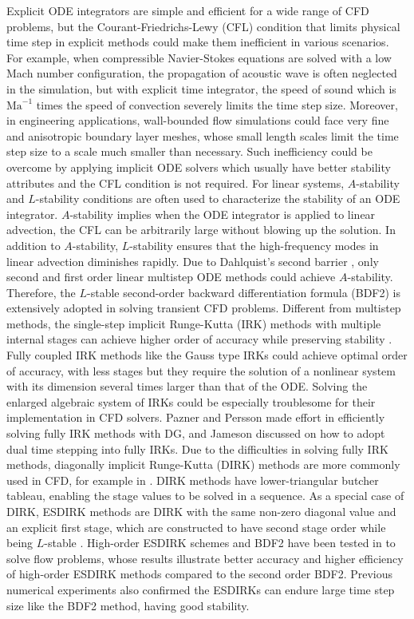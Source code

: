 Explicit ODE integrators
are simple and efficient for a wide range of
CFD problems, but the Courant-Friedrichs-Lewy (CFL) condition
that limits physical time step in explicit
methods could make them inefficient in various 
scenarios.
For example, 
when compressible Navier-Stokes equations are solved with a low Mach number configuration,
the propagation of acoustic wave is often neglected in the simulation, 
but with explicit time integrator, 
the speed of sound which is $\text{Ma}^{-1}$ times the 
speed of convection
severely limits the time step size.
Moreover, in engineering applications, 
wall-bounded flow simulations could face 
very fine and anisotropic boundary layer meshes,
whose small length scales limit the time step size 
to a scale much smaller than necessary.
Such inefficiency could be overcome by
applying implicit ODE solvers which
usually have better stability attributes and the CFL condition is not required.
For linear systems, $A$-stability and $L$-stability conditions \cite{wanner1996solving}
are often used to characterize the stability of an ODE integrator.
$A$-stability \cite{dahlquist1963special} implies 
when the ODE integrator is applied to linear advection, 
the CFL can be arbitrarily large without blowing up the solution.
In addition to $A$-stability, $L$-stability ensures that the high-frequency 
modes in linear advection diminishes rapidly.
Due to Dahlquist's second barrier
\cite{dahlquist1963special},
only second and first order linear multistep ODE methods
could achieve $A$-stability. 
Therefore,
the $L$-stable
second-order backward differentiation formula (BDF2)
is extensively adopted in solving transient CFD problems.
Different from multistep methods,
the single-step implicit Runge-Kutta (IRK) methods
with multiple internal stages
can achieve higher order of accuracy while
preserving stability \cite{butcher2016ODEBook}.
Fully coupled IRK methods like the Gauss type IRKs
could achieve optimal order of accuracy, 
with less stages
but they require the solution of a nonlinear
system with its dimension several times larger
than that of the ODE.
Solving the enlarged algebraic system of IRKs
could be especially troublesome for their implementation in
CFD solvers.
Pazner and Persson
\cite{pazner2017stage}
made effort in efficiently solving
fully IRK methods with DG, and
Jameson \cite{jameson2017evaluation}
discussed on how to adopt dual time stepping
into fully IRKs.
Due to the difficulties in solving
fully IRK methods,
diagonally implicit Runge-Kutta (DIRK)
methods are more commonly used in CFD, for example in
\cite{wang2017compact_VR}.
DIRK methods have lower-triangular butcher tableau,
enabling the stage values to be solved in a sequence.
As a special case of DIRK,
ESDIRK methods are DIRK with the same non-zero diagonal value 
and an explicit first stage,
which are constructed to have
second stage order while being $L$-stable
\cite{kennedy2003additiveARK,kvaerno2004singly}.
High-order ESDIRK schemes and
BDF2 have been tested in
\cite{bijl2002implicitBDFvESDIRK,wang2007implicitDGTests}
to solve flow problems,
whose results illustrate
better accuracy and higher efficiency
of high-order ESDIRK methods
compared to the second order BDF2.
Previous numerical experiments also confirmed
the ESDIRKs can endure large time step size like the BDF2 method, 
having good stability.



